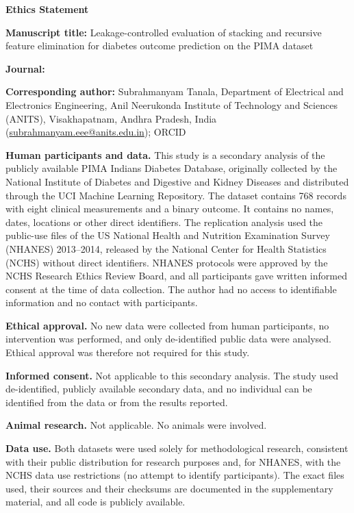 \documentclass[11pt]{article}
\begin{document}
{\Large\bfseries Ethics Statement}

\textbf{Manuscript title:} Leakage-controlled evaluation of stacking and recursive feature elimination for diabetes outcome prediction on the PIMA dataset

\textbf{Journal:} \targetjournal

\textbf{Corresponding author:} Subrahmanyam Tanala, Department of Electrical and Electronics Engineering, Anil Neerukonda Institute of Technology and Sciences (ANITS), Visakhapatnam, Andhra Pradesh, India (\href{mailto:subrahmanyam.eee@anits.edu.in}{subrahmanyam.eee@anits.edu.in}); ORCID \href{https://orcid.org/\authororcid}{\authororcid}

\bigskip
\textbf{Human participants and data.} This study is a secondary analysis of the publicly available PIMA Indians Diabetes Database, originally collected by the National Institute of Diabetes and Digestive and Kidney Diseases and distributed through the UCI Machine Learning Repository. The dataset contains 768 records with eight clinical measurements and a binary outcome. It contains no names, dates, locations or other direct identifiers. The replication analysis used the public-use files of the US National Health and Nutrition Examination Survey (NHANES) 2013--2014, released by the National Center for Health Statistics (NCHS) without direct identifiers. NHANES protocols were approved by the NCHS Research Ethics Review Board, and all participants gave written informed consent at the time of data collection. The author had no access to identifiable information and no contact with participants.

\textbf{Ethical approval.} No new data were collected from human participants, no intervention was performed, and only de-identified public data were analysed. Ethical approval was therefore not required for this study.

\textbf{Informed consent.} Not applicable to this secondary analysis. The study used de-identified, publicly available secondary data, and no individual can be identified from the data or from the results reported.

\textbf{Animal research.} Not applicable. No animals were involved.

\textbf{Data use.} Both datasets were used solely for methodological research, consistent with their public distribution for research purposes and, for NHANES, with the NCHS data use restrictions (no attempt to identify participants). The exact files used, their sources and their checksums are documented in the supplementary material, and all code is publicly available.
\end{document}
